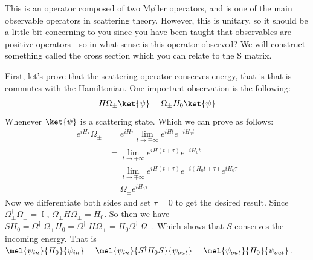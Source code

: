 \documentclass{article}
\DeclareMathOperator{\II}{\mathbb{I}}
\begin{document}
This is an operator composed of two M\o ller operators, and is one of the main observable operators in scattering theory. However, this is unitary, so it should be a little bit concerning to you since you have been taught that observables are positive operators - so in what sense is this operator observed? We will construct something called the cross section which you can relate to the S matrix. 

First, let's prove that the scattering operator conserves energy, that is that is commutes with the Hamiltonian. One important observation is the following:
\[H\Omega_\pm\ket{\psi} = \Omega_\pm H_0\ket{\psi}\]
Whenever $\ket{\psi}$ is a scattering state. Which we can prove as follows:
\begin{align}
e^{i H \tau} \Omega_\pm &= e^{iH\tau} \lim_{t\to \mp \infty} e^{iHt}e^{-iH_0 t}\\
&= \lim_{t \to \mp \infty} e^{iH(t+\tau)}e^{-iH_0t}\\
&= \lim_{t\to \mp \infty} e^{iH(t+\tau)}e^{-i(H_0t+\tau)}e^{iH_0\tau}\\
&=  \Omega_{\pm}e^{iH_0\tau}
\end{align}
Now we differentiate both sides and set $\tau = 0$ to get the desired result. Since $\Omega_\pm^\dagger \Omega_\pm = \II$, $\Omega_\pm H \Omega_\pm = H_0$. So then we have $SH_0 = \Omega_-^\dagger \Omega_+ H_0 = \Omega_-^\dagger H\Omega_+ = H_0 \Omega_-^\dagger \Omega^+$. Which shows that $S$ conserves the incoming energy. That is $\mel{\psi_{in}}{H_0}{\psi_{in}} = \mel{\psi_{in}}{S^\dagger H_0 S }{\psi_{out}} = \mel{\psi_{out}}{H_0}{\psi_{out}}$.
\end{document}
